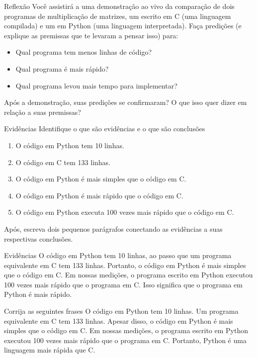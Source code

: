 \documentclass{beamer}
\begin{document}
\begin{frame}[fragile]{Reflexão}
  \centering
  \large
  Você assistirá a uma demonstração ao vivo da comparação de dois programas de
  multiplicação de matrizes, um escrito em C (uma linguagem compilada) e um em
  Python (uma linguagem interpretada). Faça predições (e explique as premissas
  que te levaram a pensar isso) para:
  \begin{itemize}
  \item Qual programa tem menos linhas de código?
  \item Qual programa é mais rápido?
  \item Qual programa levou mais tempo para implementar?
  \end{itemize}
  Após a demonstração, suas predições se confirmaram? O que isso quer dizer em
  relação a suas premissas?
\end{frame}

\begin{frame}[fragile]{Evidências}
  \centering
  \large
  Identifique o que são evidências e o que são conclusões
  \begin{enumerate}
  \item O código em Python tem 10 linhas.
  \item O código em C tem 133 linhas.
  \item O código em Python é mais simples que o código em C.
  \item O código em Python é mais rápido que o código em C.
  \item O código em Python executa 100 vezes mais rápido que o código em C.
  \end{enumerate}
  Após, escreva dois pequenos parágrafos conectando as evidências a suas
  respectivas conclusões.
\end{frame}

\begin{frame}[fragile]{Evidências}
  \centering
  O código em Python tem 10 linhas, ao passo que um programa equivalente em C
  tem 133 linhas. Portanto, o código em Python é mais simples que o código em C.
  \vspace{2cm}
  Em nossas medições, o programa escrito em Python executou 100 vezes mais
  rápido que o programa em C. Isso significa que o programa em Python é mais
  rápido.
\end{frame}

\begin{frame}[fragile]{Corrija as seguintes frases}
  \centering
  O código em Python tem 10 linhas. Um programa equivalente em C
  tem 133 linhas. Apesar disso, o código em Python é mais simples que o código em C.
  \vspace{2cm}
  Em nossas medições, o programa escrito em Python executou 100 vezes mais
  rápido que o programa em C. Portanto, Python é uma linguagem mais rápida
  que C.
\end{frame}
\end{document}
